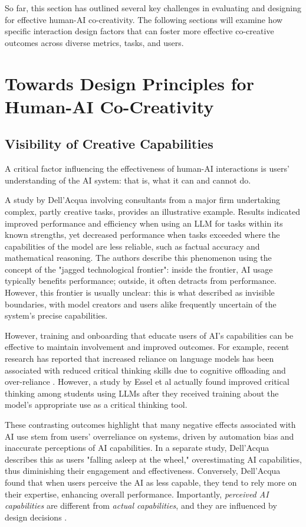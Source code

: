 So far, this section has outlined several key challenges in evaluating and designing for effective human-AI co-creativity. The following sections will examine how specific interaction design factors that can foster more effective co-creative outcomes across diverse metrics, tasks, and users. 

\section{Towards Design Principles for Human-AI Co-Creativity}

\subsection{Visibility of Creative Capabilities}

A critical factor influencing the effectiveness of human-AI interactions is users' understanding of the AI system: that is, what it can and cannot do.

A study by Dell'Acqua \cite{DellAcqua2023-og} involving consultants from a major firm undertaking complex, partly creative tasks, provides an illustrative example. Results indicated improved performance and efficiency when using an LLM for tasks within its known strengths, yet decreased performance when tasks exceeded where the capabilities of the model are less reliable, such as factual accuracy and mathematical reasoning. The authors describe this phenomenon using the concept of the "jagged technological frontier": inside the frontier, AI usage typically benefits performance; outside, it often detracts from performance. However, this frontier is usually unclear: this is what \cite{Buschek2021-ks} described as invisible boundaries, with model creators and users alike frequently uncertain of the system's precise capabilities.

However, training and onboarding that educate users of AI's capabilities can be effective to maintain involvement and improved outcomes. For example, recent research has reported that increased reliance on language models has been associated with reduced critical thinking skills due to cognitive offloading and over-reliance \cite{Gerlich2025-as, Lee2025-dw}. However, a study by Essel et al \cite{Essel2024-qc} actually found improved critical thinking among students using LLMs after they received training about the model's appropriate use as a critical thinking tool.

These contrasting outcomes highlight that many negative effects associated with AI use stem from users' overreliance on systems, driven by automation bias and inaccurate perceptions of AI capabilities. In a separate study, Dell'Acqua \cite{Dell-Acqua2022-dy} describes this as users "falling asleep at the wheel," overestimating AI capabilities, thus diminishing their engagement and effectiveness. Conversely, Dell'Acqua found that when users perceive the AI as less capable, they tend to rely more on their expertise, enhancing overall performance. Importantly, \textit{perceived AI capabilities} are different from \textit{actual capabilities}, and they are influenced by design decisions \cite{Moruzzi2022-tx, Lawton2023-tb}.

